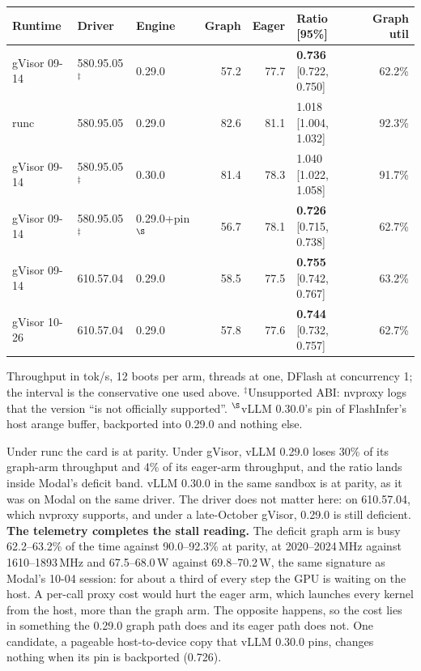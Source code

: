\documentclass[11pt]{article}
\begin{document}
\begin{center}\small
\begin{tabular}{lllrrlr}
\toprule
Runtime & Driver & Engine & Graph & Eager & Ratio [95\%] & Graph util\\
\midrule
gVisor 09-14 & 580.95.05$^\ddagger$ & 0.29.0 & 57.2 & 77.7 & \textbf{0.736} [0.722, 0.750] & 62.2\%\\
runc & 580.95.05 & 0.29.0 & 82.6 & 81.1 & 1.018 [1.004, 1.032] & 92.3\%\\
gVisor 09-14 & 580.95.05$^\ddagger$ & 0.30.0 & 81.4 & 78.3 & 1.040 [1.022, 1.058] & 91.7\%\\
gVisor 09-14 & 580.95.05$^\ddagger$ & 0.29.0+pin$^\S$ & 56.7 & 78.1 & \textbf{0.726} [0.715, 0.738] & 62.7\%\\
gVisor 09-14 & 610.57.04 & 0.29.0 & 58.5 & 77.5 & \textbf{0.755} [0.742, 0.767] & 63.2\%\\
gVisor 10-26 & 610.57.04 & 0.29.0 & 57.8 & 77.6 & \textbf{0.744} [0.732, 0.757] & 62.7\%\\
\bottomrule
\end{tabular}
\end{center}

\noindent
Throughput in tok/s, 12 boots per arm, threads at one, DFlash at
concurrency 1; the interval is the conservative one used above.
$^\ddagger$Unsupported ABI: nvproxy logs that the version ``is not officially
supported''. $^\S$vLLM 0.30.0's pin of FlashInfer's host arange buffer,
backported into 0.29.0 and nothing else.

Under runc the card is at parity. Under gVisor, vLLM 0.29.0 loses 30\% of its
graph-arm throughput and 4\% of its eager-arm throughput, and the ratio lands
inside Modal's deficit band. vLLM 0.30.0 in the same sandbox is at parity, as
it was on Modal on the same driver. The driver does not matter here: on
610.57.04, which nvproxy supports, and under a late-October gVisor, 0.29.0 is
still deficient. \textbf{The telemetry completes the stall reading.} The
deficit graph arm is busy 62.2--63.2\% of the time against 90.0--92.3\% at
parity, at 2020--2024\,MHz against 1610--1893\,MHz and 67.5--68.0\,W against
69.8--70.2\,W, the same signature as Modal's 10-04 session: for about a third
of every step the GPU is waiting on the host. A per-call proxy cost would hurt
the eager arm, which launches every kernel from the host, more than the graph
arm. The opposite happens, so the cost lies in something the 0.29.0 graph
path does and its eager path does not. One candidate, a pageable
host-to-device copy that vLLM 0.30.0 pins, changes nothing when its pin is
backported (0.726).
\end{document}
